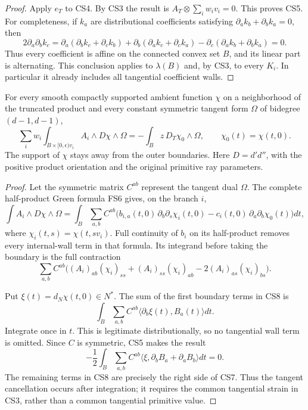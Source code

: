 \begin{proof}
Apply $e_T$ to CS4.  By CS3 the result is
$A_T\otimes\sum_iw_iv_i=0$.  This proves CS5.  For completeness,
if $k_a$ are distributional coefficients satisfying
$\partial_ak_b+\partial_bk_a=0$, then
\[
 2\partial_a\partial_bk_c
 =\partial_a(\partial_bk_c+\partial_ck_b)
  +\partial_b(\partial_ak_c+\partial_ck_a)
  -\partial_c(\partial_ak_b+\partial_bk_a)=0.
 \tag{CS6}
\]
Thus every coefficient is affine on the connected convex set
$B$, and its linear part is alternating.  This conclusion applies
to $\lambda(B)$ and, by CS3, to every $K_i$.  In particular it
already includes all tangential coefficient walls.
\end{proof}

\begin{theorem}
\label{thm:r13-common-strain-stokes}
For every smooth compactly supported ambient function $\chi$ on
a neighborhood of the truncated product and every constant
symmetric tangent form $\Omega$ of bidegree $(d-1,d-1)$,
\[
 \sum_iw_i\int_{B\times[0,\epsilon)v_i}
                       A_i\wedge D\chi\wedge\Omega
       =-\int_B z\,D_T\chi_0\wedge\Omega,
 \qquad \chi_0(t)=\chi(t,0).
 \tag{CS7}
\]
The support of $\chi$ stays away from the outer boundaries.
Here $D=d'd''$, with the positive product orientation and the
original primitive ray parameters.
\end{theorem}

\begin{proof}
Let the symmetric matrix $C^{ab}$ represent the tangent dual
$\Omega$.  The complete half-product Green formula FS6 gives,
on the branch $i$,
\[
 \int A_i\wedge D\chi\wedge\Omega
 =\int_B\sum_{a,b}C^{ab}
 \bigl(b_{i,a}(t,0)\,\partial_b\partial_s\chi_i(t,0)
              -c_i(t,0)\,\partial_a\partial_b\chi_0(t)\bigr)dt,
 \tag{CS8}
\]
where $\chi_i(t,s)=\chi(t,sv_i)$.  Full continuity of $b_i$
on its half-product removes every internal-wall term in that
formula.  Its integrand before taking the boundary is the full
contraction
\[
 \sum_{a,b}C^{ab}
   \bigl((A_i)_{ab}(\chi_i)_{ss}
          +(A_i)_{ss}(\chi_i)_{ab}
                     -2(A_i)_{as}(\chi_i)_{bs}\bigr).
 \tag{CS9}
\]

Put $\xi(t)=d_N\chi(t,0)\in N^*$.  The sum of the first
boundary terms in CS8 is
\[
       \int_B\sum_{a,b}C^{ab}
                       \langle\partial_b\xi(t),B_a(t)\rangle dt.
 \tag{CS10}
\]
Integrate once in $t$.  This is legitimate distributionally,
so no tangential wall term is omitted.  Since $C$ is symmetric,
CS5 makes the result
\[
 -\frac12\int_B\sum_{a,b}C^{ab}
                   \langle\xi,\partial_bB_a+\partial_aB_b\rangle dt
 =0.
 \tag{CS11}
\]
The remaining terms in CS8 are precisely the right side of
CS7.  Thus the tangent cancellation occurs after integration;
it requires the common tangential strain in CS3, rather than
a common tangential primitive value.
\end{proof}

